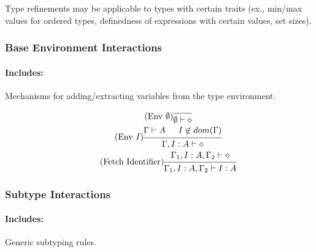 \documentclass{article}
\begin{document}
Type refinements may be applicable to types with certain traits (ex., min/max values for ordered types, definedness of expressions with certain values, set sizes). %

\subsubsection{Base Environment Interactions}
\paragraph{Includes:} Mechanisms for adding/extracting variables from the type environment.

\begin{gather}
\tag{Env $\emptyset$}
\begin{prooftree}
\infer0{\emptyset \vdash \diamond}
\end{prooftree}
\\
\tag{Env $I$}
\begin{prooftree}
\hypo{\Gamma \vdash A}
\hypo{I \not\in dom(\Gamma)}
\infer2{\Gamma, I:A \vdash \diamond}
\end{prooftree}
\\
\tag{Fetch Identifier}
\begin{prooftree}
\hypo{\Gamma_1, I:A, \Gamma_2 \vdash \diamond}
\infer1{\Gamma_1, I:A, \Gamma_2 \vdash I:A}
\end{prooftree}
\end{gather}

\subsubsection{Subtype Interactions}
\paragraph{Includes:} Generic subtyping rules.
\end{document}

